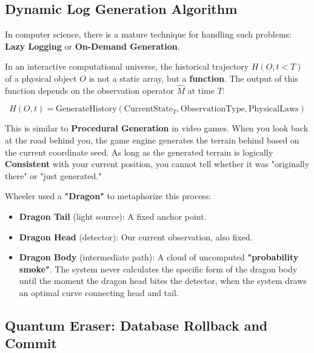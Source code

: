 \subsection{Dynamic Log Generation Algorithm}

In computer science, there is a mature technique for handling such problems: \textbf{Lazy Logging} or \textbf{On-Demand Generation}.

\begin{definition}
In an interactive computational universe, the historical trajectory $H(O, t<T)$ of a physical object $O$ is not a static array, but a \textbf{function}. The output of this function depends on the observation operator $\hat{M}$ at time $T$:

\begin{equation}
H(O, t) = \text{GenerateHistory}(\text{CurrentState}_T, \text{ObservationType}, \text{PhysicalLaws})
\end{equation}
\end{definition}

This is similar to \textbf{Procedural Generation} in video games. When you look back at the road behind you, the game engine generates the terrain behind based on the current coordinate seed. As long as the generated terrain is logically \textbf{Consistent} with your current position, you cannot tell whether it was "originally there" or "just generated."

Wheeler used a \textbf{"Dragon"} to metaphorize this process:

\begin{itemize}
\item \textbf{Dragon Tail} (light source): A fixed anchor point.

\item \textbf{Dragon Head} (detector): Our current observation, also fixed.

\item \textbf{Dragon Body} (intermediate path): A cloud of uncomputed \textbf{"probability smoke"}. The system never calculates the specific form of the dragon body until the moment the dragon head bites the detector, when the system draws an optimal curve connecting head and tail.
\end{itemize}

\subsection{Quantum Eraser: Database Rollback and Commit}

